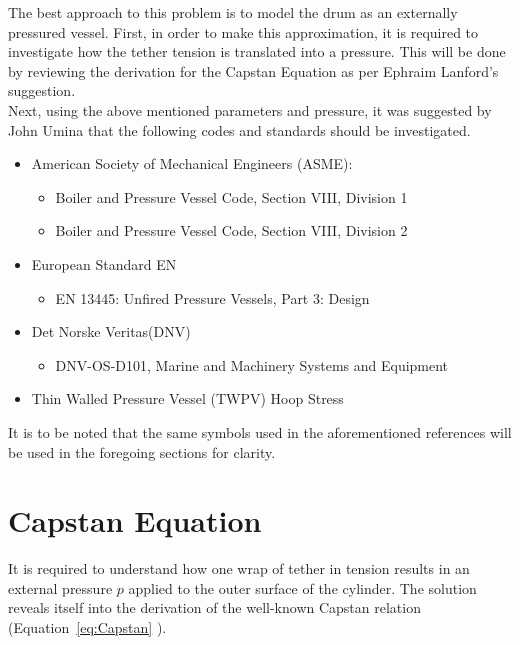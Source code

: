 The best approach to this problem is to model the drum as an externally pressured vessel. First, in order to make this approximation, it is required to investigate how the tether tension is translated into a pressure. This will be done by reviewing the derivation for the Capstan Equation as per Ephraim Lanford's suggestion.\\ 

Next, using the above mentioned parameters and pressure, it was suggested by John Umina that the following codes and standards should be investigated.
\begin{itemize}
	\item American Society of Mechanical Engineers (ASME):
	      \begin{itemize}[label=$\bullet$]
	      	\item Boiler and Pressure Vessel Code, Section VIII, Division 1\cite{ASMEbvpcVII1}
	      	\item Boiler and Pressure Vessel Code, Section VIII, Division 2\cite{ASMEbvpcVII2}
	      \end{itemize}
	\item European Standard EN
	      \begin{itemize}[label=$\bullet$]
	      	\item EN 13445: Unfired Pressure Vessels, Part 3: Design\cite{EN134453}
	      \end{itemize}
	\item Det Norske Veritas(DNV)
	      \begin{itemize}[label=$\bullet$]
	      	\item DNV-OS-D101, Marine and Machinery Systems and Equipment \cite{DNVOSD101}
	      \end{itemize}
	\item Thin Walled Pressure Vessel (TWPV) Hoop Stress \cite{roarks}\\	
\end{itemize}

It is to be noted that the same symbols used in the aforementioned references will be used in the foregoing sections for clarity.
\section{Capstan Equation}
It is required to understand how one wrap of tether in tension results in an external pressure $p$ applied to the outer surface of the cylinder. The solution reveals itself into the derivation of the well-known Capstan relation (Equation~\ref{eq:Capstan} \cite{capstanman}).

